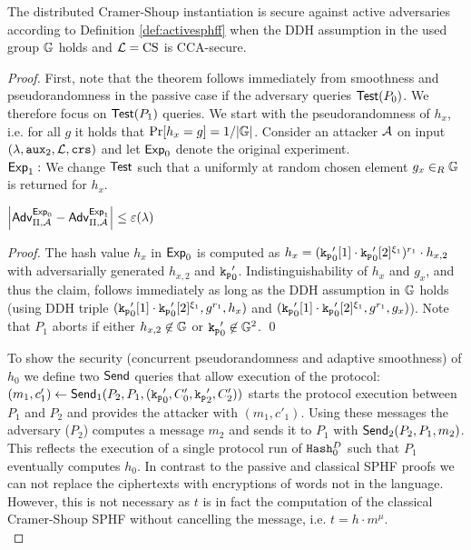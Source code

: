 \begin{theorem}\label{theo:cssphff}
The distributed Cramer-Shoup \SPHFF instantiation is secure against active adversaries according to Definition \ref{def:activesphff} when the DDH assumption in the used group $\mathbb{G}$ holds and $\mathcal{L}=\mathrm{CS}$ is CCA-secure.
\end{theorem}
\begin{proof}
First, note that the theorem follows immediately from smoothness and pseudorandomness in the passive case if the adversary queries $\mathsf{Test}(P_0)$.
We therefore focus on $\mathsf{Test}(P_1)$ queries.
We start with the pseudorandomness of $h_x$, i.e. for all $g$ it holds that $\Pr[h_x=g]=1/|\mathbb{G}|$.
Consider an attacker $\mathcal{A}$ on input $(\lambda,\mathtt{aux}_2,\mathcal{L},\mathtt{crs})$ and let $\mathsf{Exp}_0$ denote the original \SPHFF experiment.\\

\noindent$\mathsf{Exp}_1:$
We change $\mathsf{Test}$ such that a uniformly at random chosen element $g_x\in_R\mathbb{G}$ is returned for $h_x$.

\begin{claim}
$\left|\mathsf{Adv}_{\Pi,\mathcal{A}}^{\mathsf{Exp}_0}-\mathsf{Adv}_{\Pi,\mathcal{A}}^{\mathsf{Exp}_1}\right|\leq\varepsilon(\lambda)$
\end{claim}

\begin{proof}
The hash value $h_x$ in $\mathsf{Exp}_0$ is computed as $h_x=(\mathtt{k_p}'_0[1]\cdot\mathtt{k_p}'_0[2]^{\xi_1})^{r_1}\cdot h_{x,2}$ with adversarially generated $h_{x,2}$ and $\mathtt{k_p}'_0$.
Indistinguishability of $h_x$ and $g_x$, and thus the claim, follows immediately as long as the DDH assumption in $\mathbb{G}$ holds (using DDH triple $(\mathtt{k_p}'_0[1]\cdot\mathtt{k_p}'_0[2]^{\xi_1},g^{r_1},h_x)$ and $(\mathtt{k_p}'_0[1]\cdot\mathtt{k_p}'_0[2]^{\xi_1},g^{r_1},g_x)$).
Note that $P_1$ aborts if either $h_{x,2}\not\in\mathbb{G}$ or $\mathtt{k_p}_0'\not\in\mathbb{G}^2$.
\qed
\end{proof}

\noindent
To show the security (concurrent pseudorandomness and adaptive smoothness) of $h_0$ we define two $\mathsf{Send}$ queries that allow execution of the protocol:
$(m_1,c'_1)\gets\mathsf{Send}_1(P_2,P_1,(\mathtt{k_p}'_0,C'_0,\mathtt{k_p}'_2,C'_2))$ starts the protocol execution between $P_1$ and $P_2$ and provides the attacker with $(m_1,c'_1)$.
Using these messages the adversary ($P_2$) computes a message $m_2$ and sends it to $P_1$ with $\mathsf{Send}_2(P_2,P_1,m_2)$.
This reflects the execution of a single protocol run of $\mathtt{Hash}_0^D$ such that $P_1$ eventually computes $h_0$.
In contrast to the passive and classical SPHF proofs we can not replace the ciphertexts with encryptions of words not in the language.
However, this is not necessary as $t$ is in fact the \Hash computation of the classical Cramer-Shoup SPHF without cancelling the message, i.e. $t=h\cdot m^\mu$.\\


\end{proof}

